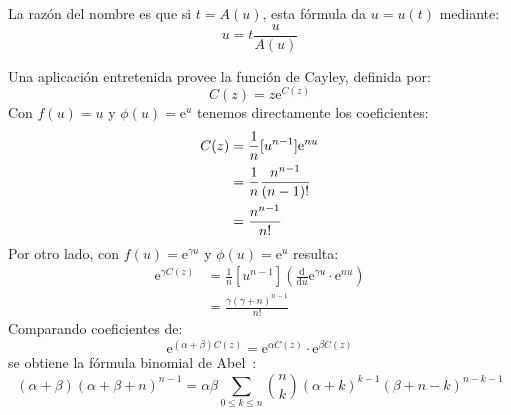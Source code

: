   La razón del nombre es que si \(t = A(u)\),
  esta fórmula da \(u = u(t)\) mediante:
  \begin{equation*}
    u = t \frac{u}{A(u)}
  \end{equation*}

  Una aplicación entretenida provee la función de Cayley,%
  definida por:
  \begin{equation}
    \label{eq:Cayley-function}
    C(z)
      = z \mathrm{e}^{C(z)}
  \end{equation}
  Con \(f(u) = u\)
  y \(\phi(u) = \mathrm{e}^u\) tenemos directamente los coeficientes:
  \begin{align}
    [z^n] C(z)
      &= \frac{1}{n} [u^{n - 1}] \mathrm{e}^{n u} \notag \\
      &= \frac{1}{n} \frac{n^{n - 1}}{(n - 1)!} \notag \\
      &= \frac{n^{n - 1}}{n!}
	    \label{eq:Cayley-coeff}
  \end{align}
  Por otro lado,
  con \(f(u) = \mathrm{e}^{\gamma u}\)
  y \(\phi(u) = \mathrm{e}^u\) resulta:
  \begin{align*}
    [z^n] \mathrm{e}^{\gamma C(z)}
      &= \frac{1}{n} [u^{n - 1}]
	   \left(
	     \frac{\mathrm{d}}{\mathrm{d} u} \mathrm{e}^{\gamma u}
	       \cdot \mathrm{e}^{n u}
	   \right) \\
      &= \frac{\gamma (\gamma + n)^{n - 1}}{n!}
  \end{align*}
  Comparando coeficientes de:
  \begin{equation*}
    \mathrm{e}^{(\alpha + \beta) C(z)}
      = \mathrm{e}^{\alpha C(z)} \cdot \mathrm{e}^{\beta C(z)}
  \end{equation*}
  se obtiene la fórmula binomial de Abel~\cite{abel26:_identity}:%
  \begin{equation}
    \label{eq:Abel-binomial}
    (\alpha + \beta) (\alpha + \beta + n)^{n - 1}
      = \alpha \beta
	  \sum_{0 \le k \le n}
	    \binom{n}{k}
	      (\alpha + k)^{k - 1}
	      (\beta + n - k)^{n - k - 1}
  \end{equation}

